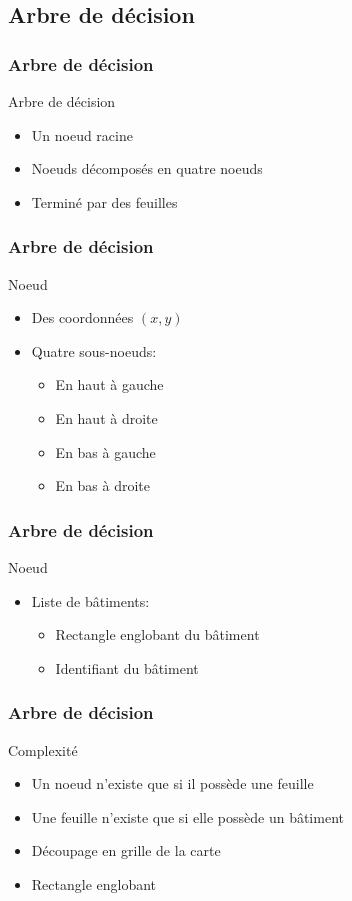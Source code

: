 \documentclass{beamer}
\begin{document}
\subsection{Arbre de décision}

\begin{frame}
\frametitle{Arbre de décision}
\begin{block}{Arbre de décision}
\begin{itemize}
\item Un noeud racine
\item Noeuds décomposés en quatre noeuds
\item Terminé par des feuilles
\end{itemize}
\end{block}
\end{frame}

\begin{frame}
\frametitle{Arbre de décision}
\begin{block}{Noeud}
\begin{itemize}
\item Des coordonnées $(x, y)$
\item Quatre sous-noeuds:\begin{itemize}
\item En haut à gauche
\item En haut à droite
\item En bas à gauche
\item En bas à droite
\end{itemize}
\end{itemize}
\end{block}
\end{frame}

\begin{frame}
\frametitle{Arbre de décision}
\begin{block}{Noeud}
\begin{itemize}
\item Liste de bâtiments:\begin{itemize}
\item Rectangle englobant du bâtiment
\item Identifiant du bâtiment
\end{itemize}
\end{itemize}
\end{block}
\end{frame}

\begin{frame}
\frametitle{Arbre de décision}
\begin{block}{Complexité}
\begin{itemize}
\item Un noeud n'existe que si il possède une feuille
\item Une feuille n'existe que si elle possède un bâtiment
\item Découpage en grille de la carte
\item Rectangle englobant
\end{itemize}
\end{block}
\end{frame}
\end{document}
